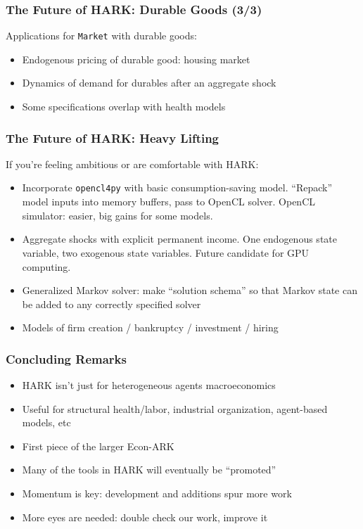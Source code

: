 \documentclass[11pt,handout]{beamer}
\newcommand{\bi}{\begin{itemize}}
\newcommand{\ei}{\end{itemize}}
\begin{document}
\begin{frame}
\frametitle{The Future of HARK: Durable Goods (3/3)}
Applications for \texttt{Market} with durable goods:
\bi
\item Endogenous pricing of durable good: housing market

\item Dynamics of demand for durables after an aggregate shock

\item Some specifications overlap with health models
\ei
\end{frame}


\begin{frame}
\frametitle{The Future of HARK: Heavy Lifting}
If you're feeling ambitious or are comfortable with HARK:
\bi
\item <1->Incorporate \texttt{opencl4py} with basic consumption-saving model.  ``Repack'' model inputs into memory buffers, pass to OpenCL solver.  OpenCL simulator: easier, big gains for some models.

\item <2->Aggregate shocks with explicit permanent income.  One endogenous state variable, two exogenous state variables.  Future candidate for GPU computing.

\item <3->Generalized Markov solver: make ``solution schema'' so that Markov state can be added to any correctly specified solver

\item <4->Models of firm creation / bankruptcy / investment / hiring
\ei
\end{frame}



\begin{frame}
\frametitle{Concluding Remarks}
\bi
\item <1->HARK isn't just for heterogeneous agents macroeconomics

\item <1->Useful for structural health/labor, industrial organization, agent-based models, etc

\item <2->First piece of the larger Econ-ARK

\item <2->Many of the tools in HARK will eventually be ``promoted''

\item <3->Momentum is key: development and additions spur more work

\item <3->More eyes are needed: double check our work, improve it
\ei
\end{frame}
\end{document}
